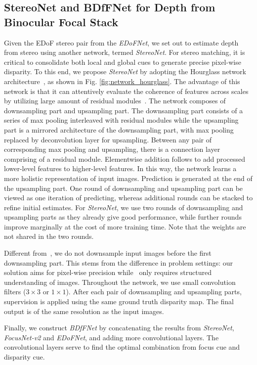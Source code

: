 \documentclass[10pt,twocolumn,letterpaper]{article}
\begin{document}
\subsection{StereoNet and BDfFNet for Depth from Binocular Focal Stack}
\label{section:stereo}
Given the EDoF stereo pair from the \emph{EDoFNet}, we set out to estimate depth from stereo using another network, termed \emph{StereoNet}. For stereo matching, it is critical to consolidate both local and global cues to generate precise pixel-wise disparity.
To this end, we propose \emph{StereoNet} by adopting the Hourglass network architecture~\cite{newell16}, as shown in Fig. \ref{fig:network_hourglass}. The advantage of this network is that it can attentively evaluate the coherence of features across scales by utilizing large amount of residual modules~\cite{he2016deep}. The network composes of downsampling part and upsampling part. The downsampling part consists of a series of max pooling interleaved with residual modules while the upsampling part is a mirrored architecture of the downsampling part, with max pooling replaced by deconvolution layer for upsampling. Between any pair of corresponding max pooling and upsampling, there is a connection layer comprising of a residual module. Elementwise addition follows to add processed lower-level features to higher-level features. In this way, the network learns a more holistic representation of input images. Prediction is generated at the end of the upsampling part. One round of downsampling and upsampling part can be viewed as one iteration of predicting, whereas additional rounds can be stacked to refine initial estimates. For \emph{StereoNet}, we use two rounds of downsampling and upsampling parts as they already give good performance, while further rounds improve marginally at the cost of more training time. Note that the weights are not shared in the two rounds.

Different from~\cite{newell16}, we do not downsample input images before the first downsampling part. This stems from the difference in problem settings: our solution aims for pixel-wise precision while~\cite{newell16} only requires structured understanding of images. Throughout the network, we use small convolution filters ($3\times3$ or $1\times1$). After each pair of downsampling and upsampling parts, supervision is applied using the same ground truth disparity map. The final output is of the same resolution as the input images.

Finally, we construct \emph{BDfFNet} by concatenating the results from \emph{StereoNet}, \emph{FocusNet-v2} and \emph{EDoFNet}, and adding more convolutional layers. The convolutional layers serve to find the optimal combination from focus cue and disparity cue.
\end{document}
